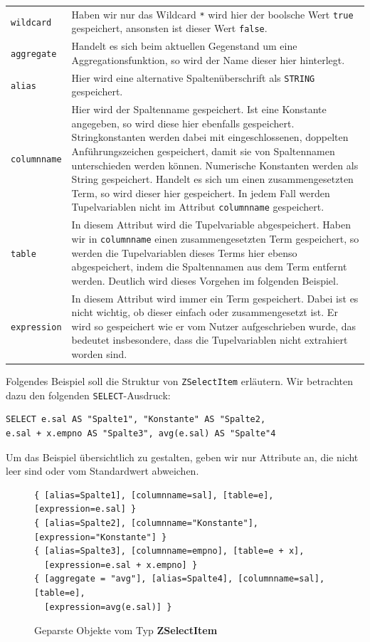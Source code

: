 \begin{tabular}{lp{}}
\verb|wildcard| & Haben wir nur das Wildcard \verb|*| wird hier der boolsche Wert \verb|true| gespeichert, ansonsten ist dieser Wert \verb|false|.\\
\verb|aggregate| & Handelt es sich beim aktuellen Gegenstand um eine Aggregationsfunktion, so wird der Name dieser hier hinterlegt.\\
\verb|alias| & Hier wird eine alternative Spaltenüberschrift als \verb|STRING| gespeichert.\\
\verb|columnname| & Hier wird der Spaltenname gespeichert. Ist eine Konstante angegeben, so wird diese hier ebenfalls gespeichert. Stringkonstanten werden dabei mit eingeschlossenen, doppelten Anführungszeichen gespeichert, damit sie von Spaltennamen unterschieden werden können. Numerische Konstanten werden als String gespeichert. Handelt es sich um einen zusammengesetzten Term, so wird dieser hier gespeichert. In jedem Fall werden Tupelvariablen nicht im Attribut \verb|columnname| gespeichert.\\
\verb|table| & In diesem Attribut wird die Tupelvariable abgespeichert. Haben wir in \verb|columnname| einen zusammengesetzten Term gespeichert, so werden die Tupelvariablen dieses Terms hier ebenso abgespeichert, indem die Spaltennamen aus dem Term entfernt werden. Deutlich wird dieses Vorgehen im folgenden Beispiel.\\
\verb|expression| & In diesem Attribut wird immer ein Term gespeichert. Dabei ist es nicht wichtig, ob dieser einfach oder zusammengesetzt ist. Er wird so gespeichert wie er vom Nutzer aufgeschrieben wurde, das bedeutet insbesondere, dass die Tupelvariablen nicht extrahiert worden sind.\\
\end{tabular}

Folgendes Beispiel soll die Struktur von \verb|ZSelectItem| erläutern. Wir betrachten dazu den folgenden \verb|SELECT|-Ausdruck: \begin{verbatim}SELECT e.sal AS "Spalte1", "Konstante" AS "Spalte2, 
e.sal + x.empno AS "Spalte3", avg(e.sal) AS "Spalte"4\end{verbatim} Um das Beispiel übersichtlich zu gestalten, geben wir nur Attribute an, die nicht leer sind oder vom Standardwert abweichen.

\begin{figure}[h]
\begin{verbatim}
{ [alias=Spalte1], [columnname=sal], [table=e], [expression=e.sal] }
{ [alias=Spalte2], [columnname="Konstante"], [expression="Konstante"] }
{ [alias=Spalte3], [columnname=empno], [table=e + x], 
  [expression=e.sal + x.empno] }
{ [aggregate = "avg"], [alias=Spalte4], [columnname=sal], [table=e], 
  [expression=avg(e.sal)] }
\end{verbatim}
\caption{Geparste Objekte vom Typ \textbf{ZSelectItem}}
\end{figure}

